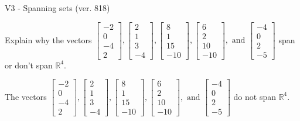 \begin{exercise}
  \begin{exerciseTitle}V3 - Spanning sets (ver. 818)\end{exerciseTitle}
  \begin{exerciseStatement}
    Explain why the vectors \(\left[\begin{array}{r}
-2 \\
0 \\
-4 \\
2
\end{array}\right] , \left[\begin{array}{r}
2 \\
1 \\
3 \\
-4
\end{array}\right] , \left[\begin{array}{r}
8 \\
1 \\
15 \\
-10
\end{array}\right] , \left[\begin{array}{r}
6 \\
2 \\
10 \\
-10
\end{array}\right] , \text{ and } \left[\begin{array}{r}
-4 \\
0 \\
2 \\
-5
\end{array}\right]\) span or don't span \(\mathbb{R}^4\). 
	


  \end{exerciseStatement}
  \begin{exerciseAnswer}
   The vectors \(\left[\begin{array}{r}
-2 \\
0 \\
-4 \\
2
\end{array}\right] , \left[\begin{array}{r}
2 \\
1 \\
3 \\
-4
\end{array}\right] , \left[\begin{array}{r}
8 \\
1 \\
15 \\
-10
\end{array}\right] , \left[\begin{array}{r}
6 \\
2 \\
10 \\
-10
\end{array}\right] , \text{ and } \left[\begin{array}{r}
-4 \\
0 \\
2 \\
-5
\end{array}\right]\) 
  	 do not  
	span \(\mathbb{R}^4\).
  



\end{exerciseAnswer}
\end{exercise}
